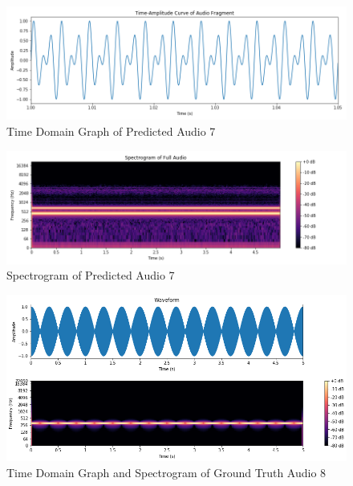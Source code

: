 \documentclass{ioereport}
\begin{document}
    \begin{figure}[H]
        \centering
        \includegraphics[width=\linewidth]{assets/audio_results/PredmultitoneA4E4time.png}
        \caption{Time Domain Graph of Predicted Audio 7}
        \label{fig:pred-multitonea4e4-time}
    \end{figure}
    \begin{figure}[H]
        \centering
        \includegraphics[width=\linewidth]{assets/audio_results/PredmultitoneA4E4spec.png}
        \caption{Spectrogram of Predicted Audio 7}
        \label{fig:pred-multitonea4e4-spec}
    \end{figure}


    \begin{figure}[H]
        \centering
        \includegraphics[width=\linewidth]{assets/audio_results/multitoneBeats.png}
        \caption{Time Domain Graph and Spectrogram of Ground Truth Audio 8}
        \label{fig:gt-multibeat-spec}
    \end{figure}
    
\end{document}

